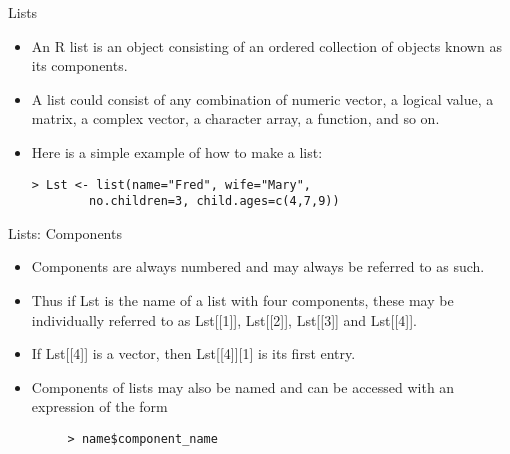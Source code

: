 \documentclass[pdf,default,slideColor,colorBG]{prosper}
\begin{document}
\begin{slide}{Lists}
\begin{itemize}
\item An R list is an object consisting of an ordered collection of objects known as its components.
\item A list could consist of any combination of numeric vector, a logical value,
a matrix, a complex vector, a character array, a function, and so on.
\item
Here is a simple example of how to make a list:
\begin{verbatim}
> Lst <- list(name="Fred", wife="Mary",
        no.children=3, child.ages=c(4,7,9))
\end{verbatim}
\end{itemize}

\end{slide}



\begin{slide}{Lists: Components}
\begin{itemize}
\item Components are always numbered and may always be referred to
as such. \item Thus if Lst is the name of a list with four
components, these may be individually referred to as Lst[[1]],
Lst[[2]], Lst[[3]] and Lst[[4]]. \item If Lst[[4]] is a vector,
then Lst[[4]][1] is its first entry. \item Components of lists may
also be named and can be accessed with an expression of the form
\begin{verbatim}
     > name$component_name
\end{verbatim}
\end{itemize}
\end{slide}
\end{document}
